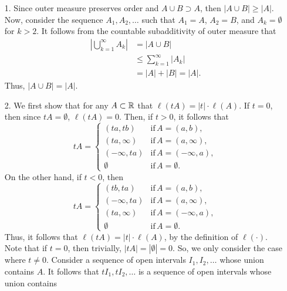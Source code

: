 \documentclass{article}
\theoremstyle{remark}
\begin{document}
\thispagestyle{firstpage}
\begin{enumerate}[leftmargin=*]
    \item[1.] Since outer measure preserves order and $A\cup B \supset A$, then
    $|A \cup B| \geq |A|$. Now, consider the sequence $A_1, A_2,\ldots$ such
    that $A_1 = A$, $A_2 = B$, and $A_k = \emptyset$ for $k > 2$. It follows
    from the countable subadditivity of outer measure that 
    \begin{align*}
        \left|\bigcup_{k=1}^\infty A_k \right| &= |A \cup B| \\
        &\leq \sum_{k=1}^\infty |A_k| \\
        &= |A| + |B| = |A|. \tag{by given}
    \end{align*} 
    Thus, $|A \cup B| = |A|$.

    \item[2.] We first show that for any $A \subset \mathbb{R}$ that $\ell(tA) =
    |t|\cdot \ell(A)$. If $t=0$, then since $tA = \emptyset$, $\ell(tA) = 0$.
    Then, if $t > 0$, it follows that 
    \begin{equation*}
        tA = \begin{cases}
            (ta, tb) & \text{if}\,A=(a,b), \\ 
            (ta,\infty) & \text{if}\,A=(a,\infty), \\
            (-\infty,ta) &\text{if}\,A=(-\infty,a), \\
            \emptyset & \text{if}\,A=\emptyset.
        \end{cases}
    \end{equation*}
    On the other hand, if $t < 0$, then 
    \begin{equation*}
        tA = \begin{cases}
            (tb, ta) &\text{if}\, A=(a,b), \\
            (-\infty,ta) &\text{if}\, A=(a,\infty), \\
            (ta,\infty) &\text{if}\, A=(-\infty,a), \\
            \emptyset &\text{if}\, A=\emptyset. 
        \end{cases}
    \end{equation*}
    Thus, it follows that $\ell(tA) = |t|\cdot \ell(A)$, by the definition of
    $\ell(\cdot)$. Note that if $t = 0$, then trivially, $|tA| = |\emptyset| =
    0$. So, we only consider the case where $t \neq 0$. Consider a sequence of
    open intervals $I_1, I_2, \ldots$ whose union contains $A$. It follows that
    $tI_1, tI_2, \ldots$ is a sequence of open intervals whose union contains

\end{enumerate}
\end{document}
